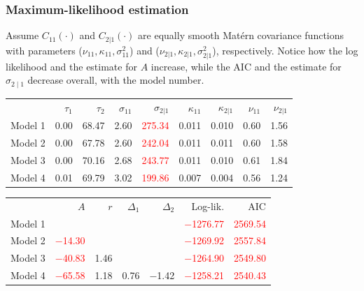 \documentclass{beamer}
\newcommand{\red}{\textcolor{red}}%
\begin{document}
\begin{frame}
\frametitle{Maximum-likelihood estimation}
\vspace{-.5cm}
Assume $C_{11}(\cdot)$ and $C_{2|1}(\cdot)$ are equally smooth Mat{\'e}rn covariance functions with parameters ($\nu_{11}, \kappa_{11}, \sigma_{11}^2$) and ($\nu_{2|1},\kappa_{2|1},\sigma_{2|1}^2$), respectively. Notice how the log likelihood and the estimate for $A$ increase, while the AIC and the estimate for $\sigma_{2\mid 1}$ decrease overall, with the model number.
\footnotesize

\begin{tabular}{rrrrrrrrr}
  & $\tau_1$ & $\tau_2$ & $\sigma_{11}$ & $\sigma_{2|1}$ & $\kappa_{11}$ & $\kappa_{2|1}$ & $\nu_{11}$ & $\nu_{2|1}$\vspace{0.07in}\\ 
Model 1 & 0.00 & 68.47 & 2.60 & \red{275.34} & 0.011 & 0.010 & 0.60 & 1.56   \\ 
  Model 2 & 0.00 & 67.78 & 2.60 & \red{242.04} & 0.011 & 0.011 & 0.60 & 1.58 \\ 
  Model 3 & 0.00 & 70.16 & 2.68 & \red{243.77} & 0.011 & 0.010 & 0.61 & 1.84 \\ 
  Model 4 & 0.01 & 69.79 & 3.02 & \red{199.86} & 0.007 & 0.004 & 0.56 & 1.24 \\ 
  \end{tabular}

\begin{tabular}{rrrrrrr}
  &  $A$ & $r$ & $\Delta_1$ & $\Delta_2$ & Log-lik. & AIC\vspace{0.07in}\\ 
Model 1 &  &  &  & & \red{$-$1276.77} & \red{2569.54} \\ 
  Model 2 & \red{$-$14.30} &  &  &  & \red{$-$1269.92} & \red{2557.84} \\ 
  Model 3 & \red{$-$40.83} & 1.46 &  &  & \red{$-$1264.90} & \red{2549.80} \\ 
  Model 4 & \red{$-$65.58} & 1.18 & 0.76 & $-$1.42 & \red{$-$1258.21} &  \red{2540.43}\\ 
  \end{tabular}


\normalsize
\end{frame}

\end{document}
